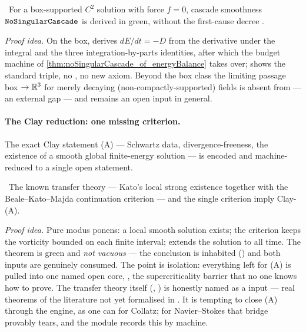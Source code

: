 \begin{theorem}\label{thm:noSingularCascade_of_r3Assembly}
\green{}\ For a box-supported $C^2$ solution with force $f = 0$, cascade smoothness
$\texttt{NoSingularCascade}$ is derived in green, without the first-cause decree .
\end{theorem}

\emph{Proof idea.} On the box,  derives $dE/dt = -D$ from the
derivative under the integral and the three integration-by-parts identities, after which the budget
machine of \cref{thm:noSingularCascade_of_energyBalance} takes over;  shows the
standard triple, no , no new axiom. Beyond the box class the limiting passage
box $\to \mathbb{R}^3$ for merely decaying (non-compactly-supported) fields is absent from  ---
an external gap --- and  remains an open \red{} input in general.

\paragraph{The Clay reduction: one missing criterion.}
The exact Clay statement (A) --- Schwartz data, divergence-freeness, the existence of a smooth
global finite-energy solution --- is encoded and machine-reduced to a single open statement.

\begin{theorem}\label{thm:clayA_of_regularityTransfer_and_vorticityControl}
\green{}\ The known transfer theory --- Kato's local strong existence \cite{kato1984} together with
the Beale--Kato--Majda continuation criterion \cite{bkm1984} --- and the single criterion
 imply Clay-(A).
\end{theorem}

\emph{Proof idea.} Pure modus ponens: a local smooth solution exists; the criterion keeps the
vorticity bounded on each finite interval; \cite{bkm1984} extends the solution to all time. The
theorem is green and \emph{not vacuous} --- the conclusion is inhabited ()
and both inputs are genuinely consumed. The point is isolation: everything left for (A) is pulled
into one named open core, , the supercriticality barrier that no one
knows how to prove. The transfer theory itself (, )
is honestly named as a \red{} input --- real theorems of the literature \cite{kato1984,bkm1984} not
yet formalised in . It is tempting to close (A) through the engine, as one can for
Collatz; for Navier--Stokes that bridge provably tears, and the module records this by machine.

